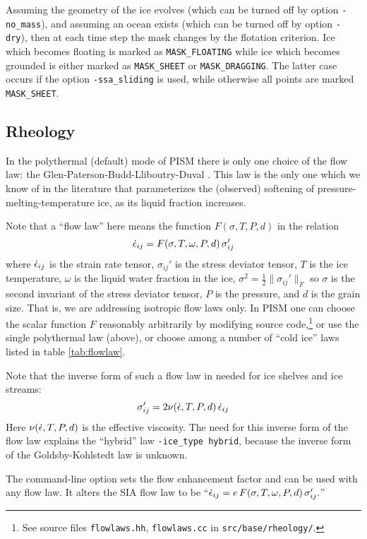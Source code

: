 Assuming the geometry of the ice evolves (which can be turned off by option \texttt{-no_mass}), and assuming an ocean exists (which can be turned off by option \texttt{-dry}), then at each time step the mask changes by the flotation criterion.  Ice which becomes floating is marked as \texttt{MASK_FLOATING} while ice which becomes grounded is either marked as \texttt{MASK_SHEET} or \texttt{MASK_DRAGGING}.  The latter case occurs if the option \texttt{-ssa_sliding} is used, while otherwise all points are marked \texttt{MASK_SHEET}.


\subsection{Rheology}
\label{sec:rheology}

In the polythermal (default) mode of PISM there is only one choice of the flow law: the Glen-Paterson-Budd-Lliboutry-Duval \cite{AschwandenBlatter,LliboutryDuval1985,PatersonBudd}. This law is the only one which we know of in the literature that parameterizes the (observed) softening of pressure-melting-temperature ice, as its liquid fraction increases.

Note that a ``flow law'' here means the function $F(\sigma,T,P,d)$ in the relation
	$$\dot {\epsilon}_{ij} = F(\sigma,T,\omega,P,d)\, \sigma_{ij}'$$
where $\dot {\epsilon}_{ij}$ is the strain rate tensor, $\sigma_{ij}'$ is the stress deviator tensor, $T$ is the ice temperature, $\omega$ is the liquid water fraction in the ice, $\sigma^2 = \frac{1}{2} \|\sigma_{ij}'\|_F$ so $\sigma$ is the second invariant of the stress deviator tensor, $P$ is the pressure, and $d$ is the grain size.  That is, we are addressing isotropic flow laws only.  In PISM one can choose the scalar function $F$ reasonably arbitrarily by modifying source code,\footnote{See source files \texttt{flowlaws.hh}, \texttt{flowlaws.cc} in \texttt{src/base/rheology/}.} or use the single polythermal law (above), or choose among a number of ``cold ice'' laws listed in table \ref{tab:flowlaw}.

Note that the inverse form of such a flow law in needed for ice shelves and ice streams:
	$$\sigma_{ij}' = 2 \nu(\dot{\epsilon},T,P,d)\,\dot {\epsilon}_{ij} $$
Here $\nu(\dot {\epsilon},T,P,d)$ is the effective viscosity.  The need for this inverse form of the flow law explains the ``hybrid'' law \texttt{-ice_type hybrid}, because the inverse form of the Goldsby-Kohlstedt law is unknown.

The command-line option  sets the flow enhancement factor and can be used with any flow law.  It alters the SIA flow law to be ``$\dot {\epsilon}_{ij} = e\, F(\sigma,T,\omega,P,d)\, \sigma_{ij}'.$''

